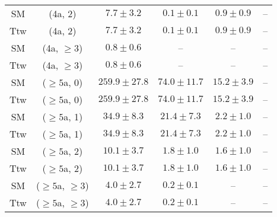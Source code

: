 \begin{table}[h!]
{\begin{tabular}{cccccc}
	SM & (4a, 2) & $7.7\pm 3.2$ & $0.1\pm 0.1$ & $0.9\pm 0.9$ & -- \\[0.5ex] 
	Ttw & (4a, 2) & $7.7\pm 3.2$ & $0.1\pm 0.1$ & $0.9\pm 0.9$ & -- \\[0.5ex] 
	SM & (4a, $\ge3$) & $0.8\pm 0.6$ & -- & -- & -- \\[0.5ex] 
	Ttw & (4a, $\ge3$) & $0.8\pm 0.6$ & -- & -- & -- \\[0.5ex] 
	SM & ($\ge5$a, 0) & $259.9\pm 27.8$ & $74.0\pm 11.7$ & $15.2\pm 3.9$ & -- \\[0.5ex] 
	Ttw & ($\ge5$a, 0) & $259.9\pm 27.8$ & $74.0\pm 11.7$ & $15.2\pm 3.9$ & -- \\[0.5ex] 
	SM & ($\ge5$a, 1) & $34.9\pm 8.3$ & $21.4\pm 7.3$ & $2.2\pm 1.0$ & -- \\[0.5ex] 
	Ttw & ($\ge5$a, 1) & $34.9\pm 8.3$ & $21.4\pm 7.3$ & $2.2\pm 1.0$ & -- \\[0.5ex] 
	SM & ($\ge5$a, 2) & $10.1\pm 3.7$ & $1.8\pm 1.0$ & $1.6\pm 1.0$ & -- \\[0.5ex] 
	Ttw & ($\ge5$a, 2) & $10.1\pm 3.7$ & $1.8\pm 1.0$ & $1.6\pm 1.0$ & -- \\[0.5ex] 
	SM & ($\ge5$a, $\ge3$) & $4.0\pm 2.7$ & $0.2\pm 0.1$ & -- & -- \\[0.5ex] 
	Ttw & ($\ge5$a, $\ge3$) & $4.0\pm 2.7$ & $0.2\pm 0.1$ & -- & -- \\[0.5ex] 
	\hline
	\hline
\end{tabular}}
\end{table}
